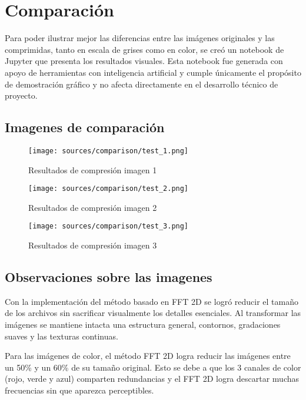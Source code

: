 \section{Comparación}

Para poder ilustrar mejor las diferencias entre las imágenes originales y las comprimidas, tanto en escala de grises como en color, se creó un notebook de Jupyter que presenta los resultados visuales. Esta notebook fue generada con apoyo de herramientas con inteligencia artificial y cumple únicamente el propósito de demostración gráfico y no afecta directamente en el desarrollo técnico de proyecto.

\subsection{Imagenes de comparación}

\begin{figure}[htbp]
  \centering
  \texttt{[image: sources/comparison/test\_1.png]}
  \caption{Resultados de compresión imagen 1}\label{fig:comparison1}
\end{figure}

\begin{figure}[htbp]
  \centering
  \texttt{[image: sources/comparison/test\_2.png]}
  \caption{Resultados de compresión imagen 2}\label{fig:comparison2}
\end{figure}

\begin{figure}[htbp]
  \centering
  \texttt{[image: sources/comparison/test\_3.png]}
  \caption{Resultados de compresión imagen 3}\label{fig:comparison3}
\end{figure}

\subsection{Observaciones sobre las imagenes}

Con la implementación del método basado en FFT 2D se logró reducir el tamaño de los archivos sin sacrificar visualmente los detalles esenciales. Al transformar las imágenes se mantiene intacta una estructura general, contornos, gradaciones suaves y las texturas continuas.

Para las imágenes de color, el método FFT 2D logra reducir las imágenes entre un 50\% y un 60\% de su tamaño original. Esto se debe a que los 3 canales de color (rojo, verde y azul) comparten redundancias y el FFT 2D logra descartar muchas frecuencias sin que aparezca perceptibles.

